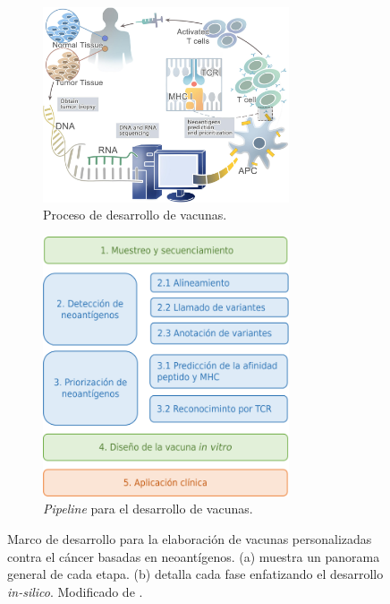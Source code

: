 \documentclass[a4paper,11pt]{article}
\begin{document}
\begin{figure}[h]
	\centering
	\begin{subfigure}[b]{0.52\textwidth}
		\centering
		\includegraphics[width=0.8\textwidth]{../img/vaccines/vaccine_pipeline}
		\caption{Proceso de desarrollo de vacunas.}
		\label{fig:vaccines_a}
	\end{subfigure}
	\hfill
	\begin{subfigure}[b]{0.44\textwidth}
		\centering
		\includegraphics[width=0.8\textwidth]{../img/vaccines/pipeline}
		\caption{\textit{Pipeline} para el desarrollo de vacunas.}
		\label{fig:vaccines_b}
	\end{subfigure}
	
	\caption{Marco de desarrollo para la elaboración de vacunas personalizadas contra el cáncer basadas en neoantígenos. (a) muestra un panorama general de cada etapa. (b) detalla cada fase enfatizando el desarrollo \textit{in-silico}.  Modificado de \cite{han2020progress}.}
	\label{fig:vaccines}
\end{figure}
	
\end{document}
